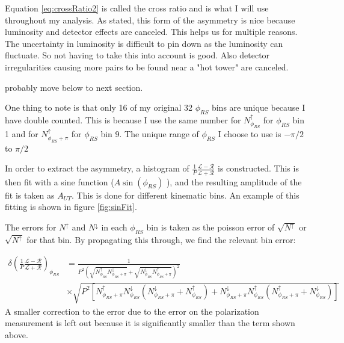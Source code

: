 \documentclass[abstract = on,listof=totoc, bibliography=totoc]{scrreprt}
\newcommand{\phirs}{\phi_{RS}}
\newcommand{\nup}{N^\uparrow}
\newcommand{\ndw}{N^\downarrow}
\begin{document}
Equation \ref{eq:crossRatio2} is called the cross ratio and is what I will use throughout my analysis. As stated, this form of the asymmetry is nice because luminosity and detector effects are canceled. This helps us for multiple reasons. The uncertainty in luminosity is difficult to pin down as the luminosity can fluctuate. So not having to take this into account is good. Also detector irregularities causing more pairs to be found near a "hot tower" are canceled.

probably move below to next section.

One thing to note is that only 16 of my original 32 $\phi_{RS}$ bins are unique because I have double counted. This is because I use the same number for $N^\uparrow_{\phi_{RS}}$ for $\phi_{RS}$ bin 1 and for $N^\uparrow_{\phi_{RS}+\pi}$ for $\phi_{RS}$ bin 9. The unique range of $\phi_{RS}$ I choose to use is $-\pi/2$ to $\pi/2$

In order to extract the asymmetry, a histogram of $\frac{1}{P}\frac{\mathcal{L} - \mathcal{R}}{\mathcal{L} + \mathcal{R}}$ is constructed. This is then fit with a sine function ($A\sin(\phirs)$ ), and the resulting amplitude of the fit is taken as $A_{UT}$. This is done for different kinematic bins. An example of this fitting is shown in figure \ref{fig:sinFit}. 

The errors for $N^\uparrow$ and $N^\downarrow$ in each $\phirs$ bin is taken as the poisson error of $\sqrt{N^\uparrow}$ or $\sqrt{N^\uparrow}$ for that bin. By propagating this through, we find the relevant bin error:

\begin{align}
\delta\left(\frac{1}{P}\frac{\mathcal{L} - \mathcal{R}}{\mathcal{L} + \mathcal{R}}\right)_{\phirs} & = \frac{1}{P^2 \left(\sqrt{\nup_{\phirs} \ndw_{\phirs+\pi}} + \sqrt{\ndw_{\phirs}\nup_{\phirs + \pi}}\right)^2} \nonumber \\
& \times \sqrt{P^2\left[   \nup_{\phirs+\pi} \ndw_{\phirs} \left( \ndw_{\phirs+\pi} + \nup_{\phirs}\right) +  \ndw_{\phirs+\pi} \nup_{\phirs} \left( \nup_{\phirs+\pi} + \ndw_{\phirs}\right) \right]}
\end{align}
%
A smaller correction to the error due to the error on the polarization measurement is left out because it is significantly smaller than the term shown above.
\end{document}
